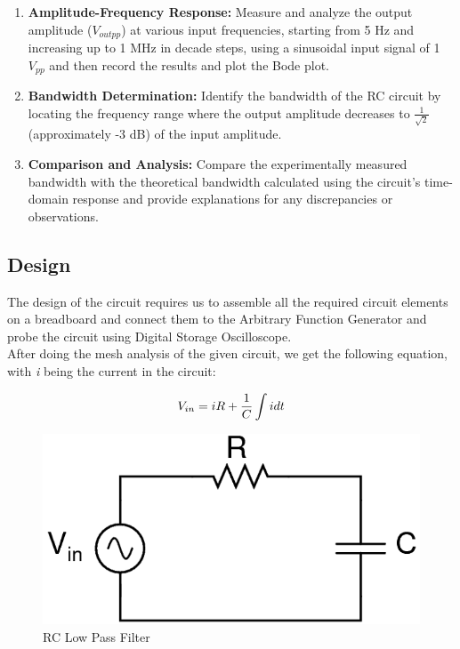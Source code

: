 \documentclass[12pt]{article}
\begin{document}
\begin{enumerate}
\item \textbf{Amplitude-Frequency Response:} Measure and analyze the output amplitude (\( V_{outpp} \)) at various input frequencies, starting from 5 Hz and increasing up to 1 MHz in decade steps, using a sinusoidal input signal of 1 \( V_{pp} \) and then record the results and plot the Bode plot.

\item \textbf{Bandwidth Determination:} Identify the bandwidth of the RC circuit by locating the frequency range where the output amplitude decreases to \( \frac{1}{\sqrt{2}} \) (approximately -3 dB) of the input amplitude.

\item \textbf{Comparison and Analysis:} Compare the experimentally measured bandwidth with the theoretical bandwidth calculated using the circuit's time-domain response and provide explanations for any discrepancies or observations.
\end{enumerate}

\subsection{Design}
The design of the circuit requires us to assemble all the required circuit elements on a breadboard and connect them to the Arbitrary Function Generator and probe the circuit using Digital Storage Oscilloscope.  \\
\hspace*{1cm}  After doing the mesh analysis of the given circuit, we get the following equation, with \textit{i} being the current in the circuit: 

\begin{equation}
     V_{in}
        \\
     = iR + \frac{1}{C}\int idt   
\end{equation}     

\begin{figure}[h!]
\centering
\includegraphics[scale = 0.3]{1.png}
\caption{RC Low Pass Filter}
\end{figure}
\end{document}
